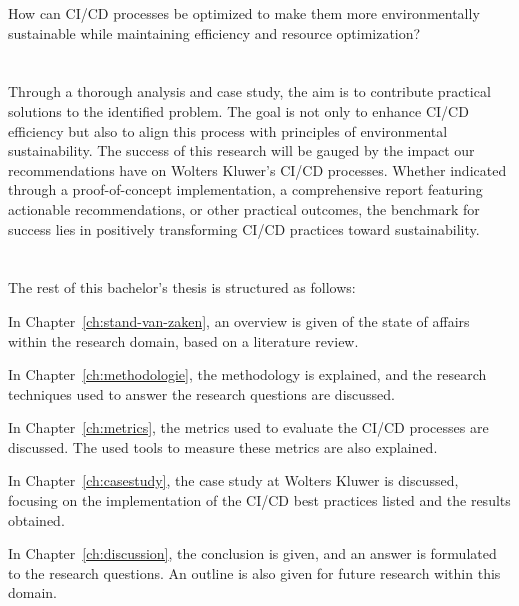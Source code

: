 How can CI/CD processes be optimized to make them more environmentally sustainable while maintaining efficiency
and resource optimization?


\section{}%
\label{sec:onderzoeksdoelstelling}

Through a thorough analysis and case study, the aim is to contribute practical solutions to the identified problem.
The goal is not only to enhance CI/CD efficiency but also to align this process with principles of environmental sustainability.
The success of this research will be gauged by the impact our recommendations have on Wolters Kluwer's CI/CD processes. 
Whether indicated through a proof-of-concept implementation, a comprehensive report featuring actionable recommendations, or other practical outcomes, the benchmark for success lies in positively transforming CI/CD practices toward sustainability.


\section{}%
\label{sec:opzet-bachelorproef}


The rest of this bachelor's thesis is structured as follows:

In Chapter~\ref{ch:stand-van-zaken}, an overview is given of the state of affairs within the research domain, based on a literature review.

In Chapter~\ref{ch:methodologie}, the methodology is explained, and the research techniques used to answer the research questions are discussed.

In Chapter~\ref{ch:metrics}, the metrics used to evaluate the CI/CD processes are discussed. The used tools to measure these metrics are also explained.

In Chapter~\ref{ch:casestudy}, the case study at Wolters Kluwer is discussed, focusing on the implementation of the CI/CD best practices listed and the results obtained.

In Chapter~\ref{ch:discussion}, the conclusion is given, and an answer is formulated to the research questions. An outline is also given for future research within this domain.